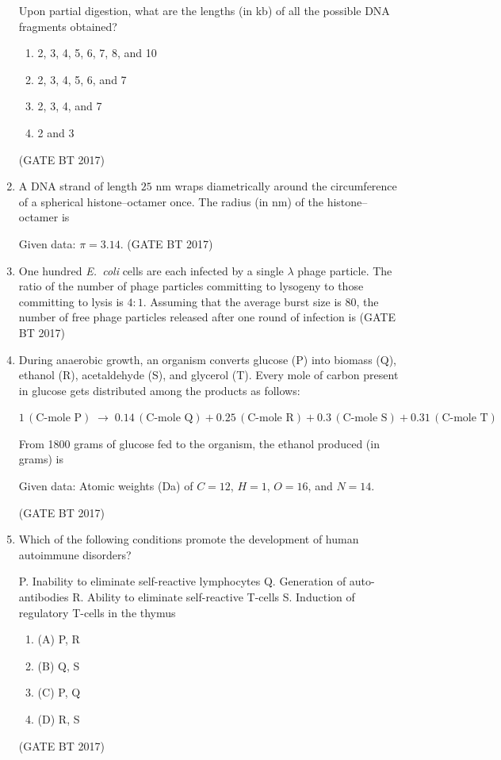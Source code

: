 \documentclass[journal,12pt,onecolumn]{IEEEtran}
\theoremstyle{remark}
\begin{document}
\begin{enumerate}
Upon partial digestion, what are the lengths (in kb) of all the possible DNA fragments obtained?

\begin{enumerate}
    \item 2, 3, 4, 5, 6, 7, 8, and 10
    \item 2, 3, 4, 5, 6, and 7
    \item 2, 3, 4, and 7
    \item 2 and 3
\end{enumerate}

\hfill (GATE BT 2017)

\item A DNA strand of length $25$ nm wraps diametrically around the circumference of a spherical histone--octamer once. The radius (in nm) of the histone--octamer is 


Given data: $\pi = 3.14$. 
\hfill (GATE BT 2017)

\item
One hundred \textit{E.\ coli} cells are each infected by a single $\lambda$ phage particle. The ratio of the number of phage particles committing to lysogeny to those committing to lysis is $4:1$. Assuming that the average burst size is $80$, the number of free phage particles released after one round of infection is 
\hfill (GATE BT 2017)

\item During anaerobic growth, an organism converts glucose (P) into biomass (Q), ethanol (R), acetaldehyde (S), and glycerol (T). Every mole of carbon present in glucose gets distributed among the products as follows:  

$1 \, (\text{C-mole P}) \;\rightarrow\; 0.14 \, (\text{C-mole Q}) + 0.25 \, (\text{C-mole R}) + 0.3 \, (\text{C-mole S}) + 0.31 \, (\text{C-mole T})$  

From 1800 grams of glucose fed to the organism, the ethanol produced (in grams) is   

Given data: Atomic weights (Da) of $C = 12$, $H = 1$, $O = 16$, and $N = 14$.  

\hfill (GATE BT 2017)

\item Which of the following conditions promote the development of human autoimmune disorders?

P. Inability to eliminate self-reactive lymphocytes
Q. Generation of auto-antibodies
R. Ability to eliminate self-reactive T-cells
S. Induction of regulatory T-cells in the thymus

\begin{enumerate}
  \item (A) P, R
  \item (B) Q, S
  \item (C) P, Q
  \item (D) R, S
\end{enumerate}
\hfill (GATE BT 2017)


\end{enumerate}
\end{document}

